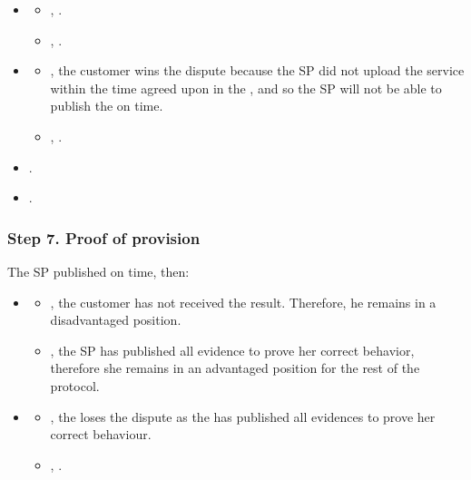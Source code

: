 \begin{itemize}
\item \AgreeablePath
  \begin{itemize}
    \item {}, \CustomerPaidButDidntGetResult{}.
    \item {}, \SpReceivedThePayment{}.
  \end{itemize}
\item \DisputePath
  \begin{itemize}
    \item {}, the customer wins the dispute because the SP did not upload the service within the time agreed upon in the \PoD{}, and so the SP will not be able to publish the \PoP{} on time.
    \item {}, .
  \end{itemize}
\end{itemize}

\Fairness

\begin{itemize}
  \item {}.
  \item {}.
\end{itemize}

\subsubsection*{Step 7. \SPTurn{} Proof of provision}\label{step-7-publication-of-proof-of-provision}

The SP published \PoP{} on time, then:

\newcommand{\CustomerLosesBecauseSPCanProveBeingCorrect}{the \customer{} loses the dispute as the \sp{} has published all evidences to prove her correct behaviour}

\begin{itemize}
  \item \AgreeablePath
    \begin{itemize}
      \item {}, the customer has not received the result. Therefore, he remains in a disadvantaged position. 
      \item {}, the SP has published all evidence to prove her correct behavior, therefore she remains in an advantaged position for the rest of the protocol.
    \end{itemize}
  \item \DisputePath
    \begin{itemize}
      \item {}, \CustomerLosesBecauseSPCanProveBeingCorrect{}.
      \item {}, .
    \end{itemize}
\end{itemize}

